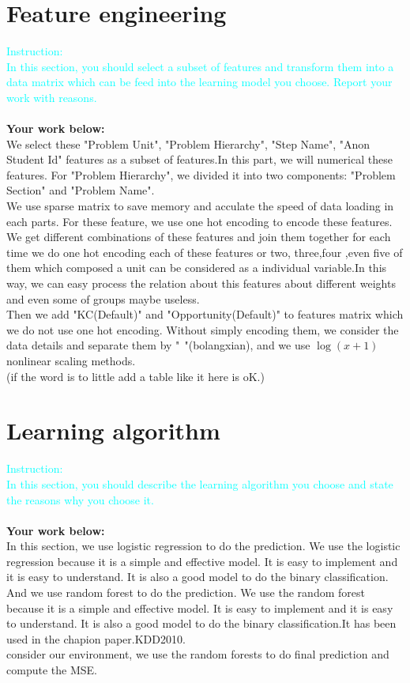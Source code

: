 \documentclass{article}
\begin{document}
\section{Feature engineering}
\textcolor{cyan}{Instruction: \\
In this section, you should select a subset of features and transform them into a data matrix which can be feed into the learning model you choose. Report your work with reasons.}\\\\
\textbf{Your work below:}\\
We select these "Problem Unit", "Problem Hierarchy", "Step Name", "Anon Student Id" features as a subset of features.In this part, we will numerical these features. For "Problem Hierarchy", we divided it into two components: "Problem Section" and "Problem Name".\\
We use sparse matrix to save memory and acculate the speed of data loading in each parts. For these feature, we use one hot encoding to encode these features. We get different combinations of these features and join them together for each time we do one hot encoding each of these features or two, three,four ,even five of them which composed a unit can be considered as a individual variable.In this way, we can easy process the relation about this features about different weights and even some of groups maybe useless.\\
Then we add "KC(Default)" and "Opportunity(Default)" to features matrix which we do not use one hot encoding. Without simply encoding them, we consider the data details and separate them by "$~~$"(bolangxian), and we use $\log (x+1)$ nonlinear scaling methods.\\
(if the word is to little add a table like it here is  oK.)
\section{Learning algorithm}
  \textcolor{cyan}{Instruction: \\
In this section, you should describe the learning algorithm you choose and state the reasons why you choose it.}\\\\
\textbf{Your work below:}\\
In this section, we use logistic regression to do the prediction. We use the logistic regression because it is a simple and effective model. It is easy to implement and it is easy to understand. It is also a good model to do the binary classification.\\ 
And we use random forest to do the prediction. We use the random forest because it is a simple and effective model. It is easy to implement and it is easy to understand. It is also a good model to do the binary classification.It has been used in the chapion paper.KDD2010.\\
consider our environment, we use the random forests to do final prediction and compute the MSE.\\
\end{document}

